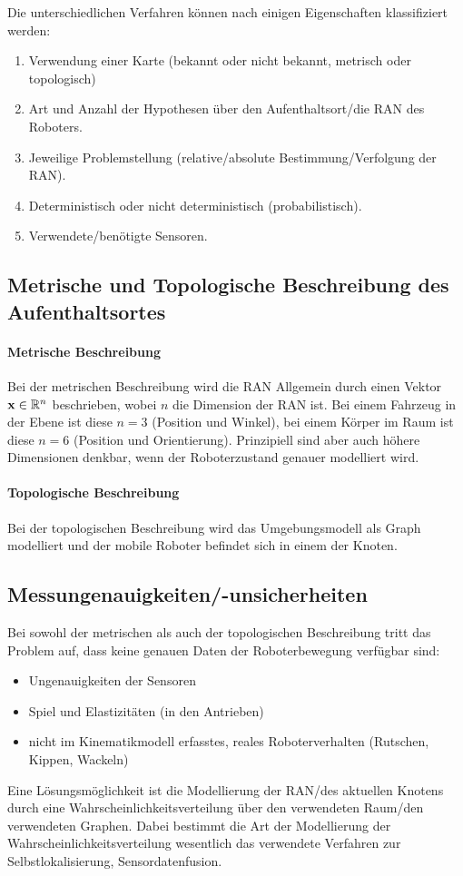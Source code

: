		Die unterschiedlichen Verfahren können nach einigen Eigenschaften klassifiziert werden:
		\begin{enumerate}
			\item Verwendung einer Karte (bekannt oder nicht bekannt, metrisch oder topologisch)
			\item Art und Anzahl der Hypothesen über den Aufenthaltsort/die RAN des Roboters.
			\item Jeweilige Problemstellung (relative/absolute Bestimmung/Verfolgung der RAN).
			\item Deterministisch oder nicht deterministisch (probabilistisch).
			\item Verwendete/benötigte Sensoren.
		\end{enumerate}
	
		\subsection{Metrische und Topologische Beschreibung des Aufenthaltsortes}
			\paragraph{Metrische Beschreibung}
				Bei der metrischen Beschreibung wird die RAN Allgemein durch einen Vektor \( \boldsymbol{\mathrm{x}} \in \mathbb{R}^n \) beschrieben, wobei \(n\) die Dimension der RAN ist. Bei einem Fahrzeug in der Ebene ist diese \( n = 3 \) (Position und Winkel), bei einem Körper im Raum ist diese \( n = 6 \) (Position und Orientierung). Prinzipiell sind aber auch höhere Dimensionen denkbar, wenn der Roboterzustand genauer modelliert wird.
			
			\paragraph{Topologische Beschreibung}
				Bei der topologischen Beschreibung wird das Umgebungsmodell als Graph modelliert und der mobile Roboter befindet sich in einem der Knoten.
		
		\subsection{Messungenauigkeiten/-unsicherheiten}
			Bei sowohl der metrischen als auch der topologischen Beschreibung tritt das Problem auf, dass keine genauen Daten der Roboterbewegung verfügbar sind:
			\begin{itemize}
				\item Ungenauigkeiten der Sensoren
				\item Spiel und Elastizitäten (\zB in den Antrieben)
				\item nicht im Kinematikmodell erfasstes, reales Roboterverhalten (\zB Rutschen, Kippen, Wackeln)
			\end{itemize}
			Eine Lösungsmöglichkeit ist die Modellierung der RAN/des aktuellen Knotens durch eine Wahrscheinlichkeitsverteilung über den verwendeten Raum/den verwendeten Graphen. Dabei bestimmt die Art der Modellierung der Wahrscheinlichkeitsverteilung wesentlich das verwendete Verfahren zur Selbstlokalisierung, \bzw Sensordatenfusion.

